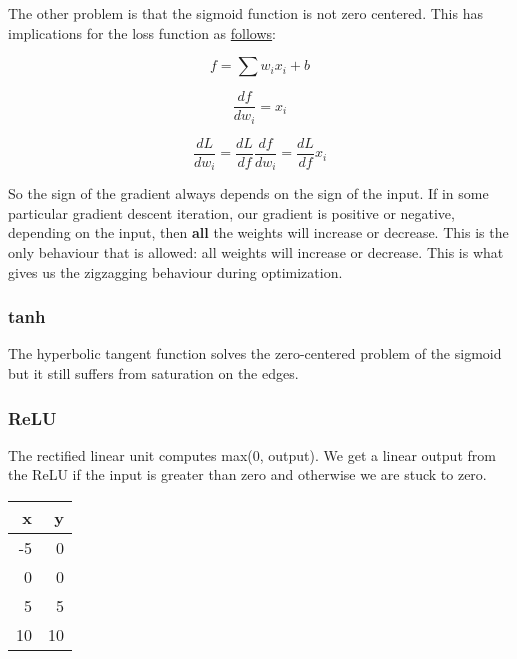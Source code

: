 \documentclass[11pt]{article}
\begin{document}
The other problem is that the sigmoid function is not zero centered. This has implications
for the loss function as \href{https://stats.stackexchange.com/questions/237169/why-are-non-zero-centered-activation-functions-a-problem-in-backpropagation}{follows}: 

\begin{center}

\begin{equation}
f=\sum w_ix_i+b
\end{equation}

\begin{equation}
\frac{df}{dw_i}=x_i
\end{equation}

\begin{equation}
\frac{dL}{dw_i}=\frac{dL}{df}\frac{df}{dw_i}=\frac{dL}{df}x_i
\end{equation}

\end{center} 

So the sign of the gradient always depends on the sign of the input. If in some particular gradient
descent iteration, our gradient is positive or negative, depending on the input, then \textbf{all} the weights
will increase or decrease. This is the only behaviour that is allowed: all weights will increase or
decrease. This is what gives us the zigzagging behaviour during optimization.

\subsubsection{tanh}
\label{sec:orge0a995b}

The hyperbolic tangent function solves the zero-centered problem of the sigmoid but it still suffers from 
saturation on the edges.

\subsubsection{ReLU}
\label{sec:orgc1cb745}

The rectified linear unit computes max(0, output). We get a linear output from the ReLU if the input is 
greater than zero and otherwise we are stuck to zero.

\begin{center}
\begin{tabular}{rr}
x & y\\
\hline
-5 & 0\\
0 & 0\\
5 & 5\\
10 & 10\\
\end{tabular}
\end{center}
\end{document}
